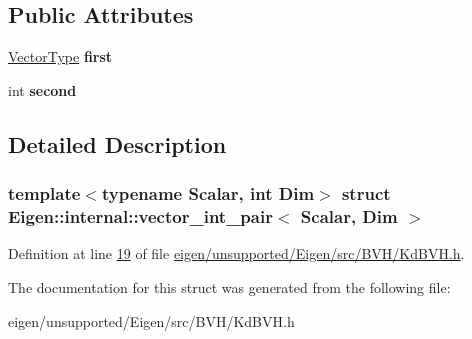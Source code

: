 \subsection*{Public Attributes}
\begin{DoxyCompactItemize}
\item 
\mbox{\label{struct_eigen_1_1internal_1_1vector__int__pair_ac60f6d67d3ac946ba25a0f64bc1ace3d}} 
\hyperlink{group___core___module}{Vector\+Type} {\bfseries first}
\item 
\mbox{\label{struct_eigen_1_1internal_1_1vector__int__pair_adb3396ab7a53b0ac2b62dfd8dfc2d268}} 
int {\bfseries second}
\end{DoxyCompactItemize}


\subsection{Detailed Description}
\subsubsection*{template$<$typename Scalar, int Dim$>$\newline
struct Eigen\+::internal\+::vector\+\_\+int\+\_\+pair$<$ Scalar, Dim $>$}



Definition at line \hyperlink{eigen_2unsupported_2_eigen_2src_2_b_v_h_2_kd_b_v_h_8h_source_l00019}{19} of file \hyperlink{eigen_2unsupported_2_eigen_2src_2_b_v_h_2_kd_b_v_h_8h_source}{eigen/unsupported/\+Eigen/src/\+B\+V\+H/\+Kd\+B\+V\+H.\+h}.



The documentation for this struct was generated from the following file\+:\begin{DoxyCompactItemize}
\item 
eigen/unsupported/\+Eigen/src/\+B\+V\+H/\+Kd\+B\+V\+H.\+h\end{DoxyCompactItemize}
